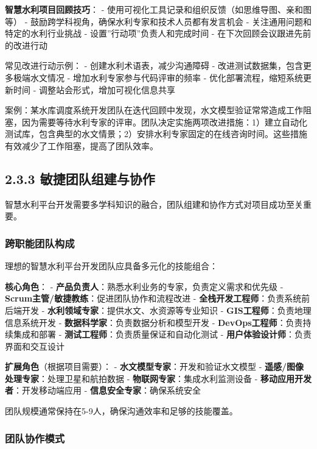\textbf{智慧水利项目回顾技巧}： -
使用可视化工具记录和组织反馈（如思维导图、亲和图等） -
鼓励跨学科视角，确保水利专家和技术人员都有发言机会 -
关注通用问题和特定的水利行业挑战 - 设置''行动项''负责人和完成时间 -
在下次回顾会议跟进先前的改进行动

常见改进行动示例： - 创建水利术语表，减少沟通障碍 -
改进测试数据集，包含更多极端水文情况 - 增加水利专家参与代码评审的频率 -
优化部署流程，缩短系统更新时间 - 调整站会形式，增加可视化信息共享

案例：某水库调度系统开发团队在迭代回顾中发现，水文模型验证常常造成工作阻塞，因为需要等待水利专家的评审。团队决定实施两项改进措施：1）建立自动化测试库，包含典型的水文情景；2）安排水利专家固定的在线咨询时间。这些措施有效减少了工作阻塞，提高了团队效率。

\subsection{2.3.3
敏捷团队组建与协作}\label{ux654fux6377ux56e2ux961fux7ec4ux5efaux4e0eux534fux4f5c}

智慧水利平台开发需要多学科知识的融合，团队组建和协作方式对项目成功至关重要。

\subsubsection{跨职能团队构成}\label{ux8de8ux804cux80fdux56e2ux961fux6784ux6210}

理想的智慧水利平台开发团队应具备多元化的技能组合：

\textbf{核心角色}： -
\textbf{产品负责人}：熟悉水利业务的专家，负责定义需求和优先级 -
\textbf{Scrum主管/敏捷教练}：促进团队协作和流程改进 -
\textbf{全栈开发工程师}：负责系统前后端开发 -
\textbf{水利领域专家}：提供水文、水资源等专业知识 -
\textbf{GIS工程师}：负责地理信息系统开发 -
\textbf{数据科学家}：负责数据分析和模型开发 -
\textbf{DevOps工程师}：负责持续集成和部署 -
\textbf{测试工程师}：负责质量保证和自动化测试 -
\textbf{用户体验设计师}：负责界面和交互设计

\textbf{扩展角色}（根据项目需要）： -
\textbf{水文模型专家}：开发和验证水文模型 -
\textbf{遥感/图像处理专家}：处理卫星和航拍数据 -
\textbf{物联网专家}：集成水利监测设备 -
\textbf{移动应用开发者}：开发移动端应用 -
\textbf{信息安全专家}：确保系统安全

团队规模通常保持在5-9人，确保沟通效率和足够的技能覆盖。

\subsubsection{团队协作模式}\label{ux56e2ux961fux534fux4f5cux6a21ux5f0f}

